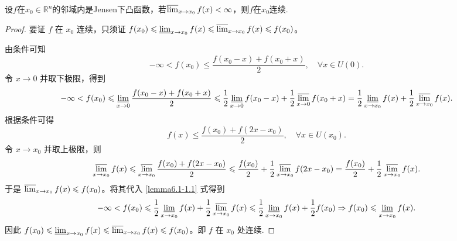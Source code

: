 \documentclass[../../main.tex]{subfiles}%
\begin{document}
\begin{lemma}\label{lemma:关于Jensen下凸与连续的引理}
设\(f\)在\(x_0\in\mathbb{R}^n\)的邻域内是Jensen下凸函数，若\(\varlimsup_{x\rightarrow x_0}f(x)<\infty\)，则\(f\)在\(x_0\)连续.
\end{lemma}
\begin{proof}
要证 \(f\) 在 \(x_0\) 连续，只须证 \(f(x_0) \leqslant \varliminf_{x \to x_0} f(x) \leqslant \varlimsup_{x \to x_0} f(x) \leqslant f(x_0)\)。

由条件可知
\[
-\infty < f(x_0) \leqslant \frac{f(x_0 - x) + f(x_0 + x)}{2}, \quad \forall x \in U(0).
\]
令 \(x \to 0\) 并取下极限，得到
\begin{align}
-\infty < f(x_0) \leqslant \varliminf_{x \to 0} \frac{f(x_0 - x) + f(x_0 + x)}{2} 
\leqslant \frac{1}{2} \varliminf_{x \to 0} f(x_0 - x) + \frac{1}{2} \varlimsup_{x \to 0} f(x_0 + x) 
= \frac{1}{2} \varliminf_{x \to x_0} f(x) + \frac{1}{2} \varlimsup_{x \to x_0} f(x). \label{lemma6.1-1.1}
\end{align}
根据条件可得
\[
f(x) \leqslant \frac{f(x_0) + f(2x - x_0)}{2}, \quad \forall x \in U(x_0).
\]
令 \(x \to x_0\) 并取上极限，则
\begin{align*}
\varlimsup_{x \to x_0} f(x)\leqslant \varlimsup_{x \to x_0} \frac{f(x_0) + f(2x - x_0)}{2} 
\leqslant \frac{f(x_0)}{2} + \frac{1}{2} \varlimsup_{x \to x_0} f(2x - x_0) 
= \frac{f(x_0)}{2} + \frac{1}{2} \varlimsup_{x \to x_0} f(x).
\end{align*}
于是 \(\varlimsup_{x \to x_0} f(x) \leqslant f(x_0)\)。将其代入 \eqref{lemma6.1-1.1} 式得到
\begin{align*}
-\infty < f(x_0) \leqslant \frac{1}{2} \varliminf_{x \to x_0} f(x) + \frac{1}{2} \varlimsup_{x \to x_0} f(x) 
\leqslant \frac{1}{2} \varliminf_{x \to x_0} f(x) + \frac{1}{2} f(x_0) 
\Rightarrow f(x_0) \leqslant \varliminf_{x \to x_0} f(x).
\end{align*}
因此 \(f(x_0) \leqslant \varliminf_{x \to x_0} f(x) \leqslant \varlimsup_{x \to x_0} f(x) \leqslant f(x_0)\)。即 \(f\) 在 \(x_0\) 处连续.
\end{proof}
\end{document}
